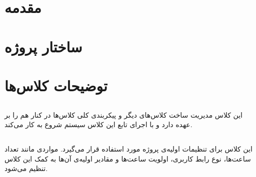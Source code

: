 \documentclass[oneside,a4paper,11pt]{report}
\begin{document}
\patchcmd{\chapter}{\thispagestyle{plain}}{\thispagestyle{fancy}}{}{}


\pagestyle{fancy}

\lhead{}
\rhead{\leftmark}
\newpage
%

\setcounter{secnumdepth}{0}
\tableofcontents \newpage


\section{مقدمه}

\section{ساختار پروژه}

\begin{latin}

\end{latin}

\section{توضیحات کلاس‌ها}

\subsection{}

این کلاس مدیریت ساخت کلاس‌های دیگر و پیکربندی کلی کلاس‌ها در کنار هم را بر عهده دارد و
با اجرای تابع 
این کلاس سیستم شروع به کار می‌کند.

\subsection{}

این کلاس برای تنظیمات اولیه‌ی پروژه مورد استفاده قرار می‌گیرد. مواردی مانند تعداد ساعت‌ها، نوع رابط کاربری، اولویت ساعت‌ها و مقادیر اولیه‌ی آن‌ها به کمک این کلاس تنظیم می‌شود.
\end{document}
